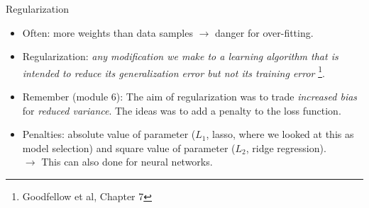 \documentclass[
  10pt,
  ignorenonframetext,
]{beamer}
\providecommand{\tightlist}{%
  \setlength{\itemsep}{0pt}\setlength{\parskip}{0pt}}
\begin{document}
\begin{frame}
\begin{block}{Regularization}
\protect\hypertarget{regularization}{}
\(~\)

\begin{itemize}
\tightlist
\item
  Often: more weights than data samples \(\rightarrow\) danger for
  over-fitting.
\end{itemize}

\vspace{2mm}

\begin{itemize}
\tightlist
\item
  Regularization: \emph{any modification we make to a learning algorithm
  that is intended to reduce its generalization error but not its
  training error} \footnote{Goodfellow et al, Chapter 7}.
\end{itemize}

\vspace{2mm}

\begin{itemize}
\tightlist
\item
  Remember (module 6): The aim of regularization was to trade
  \emph{increased bias} for \emph{reduced variance}. The ideas was to
  add a penalty to the loss function.
\end{itemize}

\vspace{2mm}

\begin{itemize}
\tightlist
\item
  Penalties: absolute value of parameter (\(L_1\), lasso, where we
  looked at this as model selection) and square value of parameter
  (\(L_2\), ridge regression).\\
  \(\rightarrow\) This can also done for neural networks.
\end{itemize}
\end{block}
\end{frame}
\end{document}
